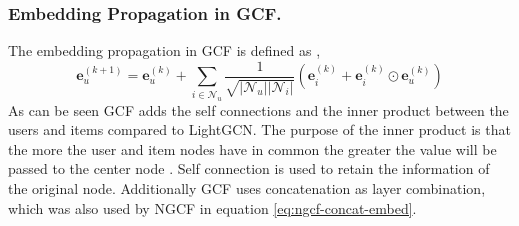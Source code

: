 \subsubsection{Embedding Propagation in GCF.}
The embedding propagation in GCF is defined as \cite{BiTGCF},
\begin{equation}
    \mathbf{e}_{u}^{(k+1)} = \mathbf{e}_{u}^{(k)} + \sum^{}_{i \in \mathcal{N}_u}  \frac{1}{\sqrt{|\mathcal{N}_u||\mathcal{N}_i|}}\left( \mathbf{e}_i^{(k)} + \mathbf{e}_i^{(k)} \odot \mathbf{e}_u^{(k)} \right)
\end{equation}
As can be seen GCF adds the self connections and the inner product between the users and items compared to LightGCN.
The purpose of the inner product is that the more the user and item nodes have in common the greater the value will be passed to the center node \cite{BiTGCF}.
Self connection is used to retain the information of the original node.
Additionally GCF uses concatenation as layer combination, which was also used by NGCF in equation \autoref{eq:ngcf-concat-embed}.
